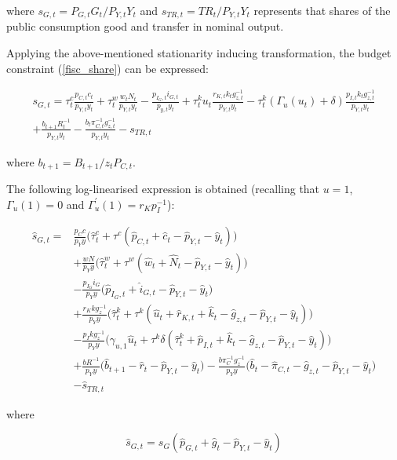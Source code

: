 \documentclass[a4paper,11pt]{article}
\numberwithin{equation}{section}
\begin{document}
	where $s_{G,t}=P_{G,t}G_t/P_{Y,t}Y_t$ and $s_{TR,t}=TR_t/P_{Y,t}Y_t$ represents that shares of the public consumption good and transfer in nominal output.
	
	Applying the above-mentioned stationarity inducing transformation, the budget constraint (\ref{fisc_share}) can be expressed:
	
	\begin{multline}
	s_{G,t}=\tau_t^c\frac{p_{C,t}c_t}{p_{Y,t}y_t}+\tau_t^w\frac{w_{t}N_t}{p_{Y,t}y_t}-\frac{p_{I_G,t}i_{G,t}}{p_{y,t}y_t}+\tau_t^ku_t\frac{r_{K,t}k_tg_{z,t}^{-1}}{p_{Y,t}y_t}-\tau_t^k\left(\Gamma_u(u_t)+\delta\right)\frac{p_{I,t}k_tg_{z,t}^{-1}}{p_{Y,t}y_t}\\
	+\frac{b_{t+1}R_t^{-1}}{p_{Y,t}y_t}-\frac{b_t\pi_{C,t}^{-1}g_{z,t}^{-1}}{p_{Y,t}y_t}-s_{TR,t}
	\end{multline}
	
	where $b_{t+1}=B_{t+1}/z_tP_{C,t}$.
	
	The following log-linearised expression is obtained (recalling that $u=1$, $\Gamma_u(1)=0$ and $\Gamma_u^{'}(1)=r_Kp_I^{-1}$):
	
	\begin{align}
	\hat{s}_{G,t}=&\frac{p_C c}{p_Y y}\Big(\hat{\tau}_t^c+\tau^c\left(\hat{p}_{C,t}+\hat{c}_t-\hat{p}_{Y,t}-\hat{y}_t\right)\Big)\\
	&+\frac{wN}{p_Y y}\Big(\hat{\tau}_t^w+\tau^w\left(\hat{w}_{t}+\hat{N}_t-\hat{p}_{Y,t}-\hat{y}_t\right)\Big)\nonumber\\
	&-\frac{p_{I_G} i_G}{p_Y y}\Big(\hat{p}_{I_G,t}+\hat{i}_{G,t}-\hat{p}_{Y,t}-\hat{y}_t\Big)\nonumber\\
	&+\frac{r_Kkg_z^{-1}}{p_Y y}\Big(\hat{\tau}_t^k+\tau^k\left(\hat{u}_t+\hat{r}_{K,t}+\hat{k}_t-\hat{g}_{z,t}-\hat{p}_{Y,t}-\hat{y}_t\right)\Big)\nonumber\\
	&-\frac{p_Ikg_z^{-1}}{p_Y y}\Big(\gamma_{u,1}\hat{u}_t+\tau^k\delta\left(\hat{\tau}_t^k+\hat{p}_{I,t}+\hat{k}_t-\hat{g}_{z,t}-\hat{p}_{Y,t}-\hat{y}_t\right)\Big)\nonumber\\
	&+\frac{bR^{-1}}{p_Yy}\Big(\hat{b}_{t+1}-\hat{r}_t-\hat{p}_{Y,t}-\hat{y}_t\Big)-\frac{b\pi_C^{-1}g_z^{-1}}{p_Yy}\Big(\hat{b}_t-\hat{\pi}_{C,t}-\hat{g}_{z,t}-\hat{p}_{Y,t}-\hat{y}_t\Big)\nonumber\\
	&-\hat{s}_{TR,t}\nonumber
	\end{align} 
	
	where
	
	\begin{equation}
	\hat{s}_{G,t}=s_G\left(\hat{p}_{G,t}+\hat{g}_t-\hat{p}_{Y,t}-\hat{y}_t\right)
	\end{equation}
	
\end{document}
